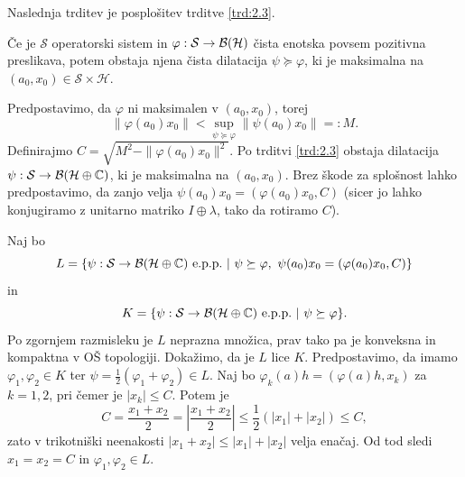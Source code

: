 Naslednja trditev je posplošitev trditve \ref{trd:2.3}.

\begin{trditev}\label{trd:3.1}
    Če je $\mathcal{S}$ operatorski sistem in $\varphi: \mathcal{S} \to \operatorname{\mathcal{B} (\mathcal{H})}$ čista
    enotska povsem pozitivna preslikava, potem obstaja njena čista dilatacija $\psi \succeq \varphi$, ki je maksimalna na $(a_0, x_0) \in \mathcal{S} \times \mathcal{H}$.
\end{trditev}

\begin{dokaz}
    Predpostavimo, da $\varphi$ ni maksimalen v $(a_0, x_0)$, torej 
    $$\| \varphi (a_0) x_0\| < \sup_{\psi \succeq \varphi} \| \psi (a_0) x_0\| =: M.$$
    Definirajmo $C = \sqrt{M^2 - \| \varphi(a_0) x_0 \|^2}$. Po trditvi \ref{trd:2.3}
    obstaja dilatacija $\psi: \mathcal{S} \to \mathcal{B}(\mathcal{H} \oplus \mathbb C)$,
    ki je maksimalna na $(a_0, x_0)$. Brez škode za splošnost lahko predpostavimo, da zanjo velja $\psi(a_0)x_0 = (\varphi(a_0)x_0, C)$
    (sicer jo lahko konjugiramo z unitarno matriko $I \oplus \lambda$, tako da rotiramo $C$).
    
    Naj bo $$L = \{\psi: \mathcal{S} \to \mathcal{B}(\mathcal{H} \oplus \mathbb C) \text{ e.p.p.}\ |\ \psi \succeq \varphi,\ \psi(a_0)x_0 = (\varphi(a_0)x_0, C) \}$$
    in $$K = \{\psi: \mathcal{S} \to \mathcal{B}(\mathcal{H} \oplus \mathbb C) \text{ e.p.p.}\ |\ \psi \succeq \varphi \}.$$
    Po zgornjem razmisleku je $L$ neprazna množica, prav tako pa je konveksna in kompaktna v OŠ topologiji.
    Dokažimo, da je $L$ lice $K$. Predpostavimo, da imamo $\varphi_1, \varphi_2 \in K$
    ter $\psi = \frac{1}{2} (\varphi_1 + \varphi_2) \in L.$
    Naj bo $\varphi_k (a) h = (\varphi(a)h, x_k)$ za $k = 1, 2$,
    pri čemer je $|x_k| \leq C$. Potem je 
    $$C = \frac{x_1 + x_2}{2} = \left| \frac{x_1 + x_2}{2} \right| \leq \frac{1}{2} (|x_1| + |x_2|) \leq C,$$
    zato v trikotniški neenakosti $|x_1 + x_2| \leq |x_1 | + |x_2|$ velja enačaj. Od tod sledi $x_1 = x_2 = C$ in 
    $\varphi_1, \varphi_2 \in L$. 
    

\end{dokaz}
